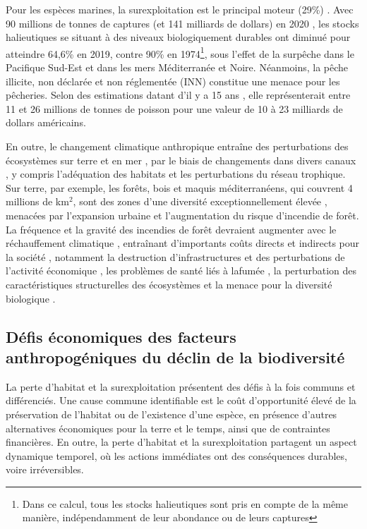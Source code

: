 Pour les espèces marines, la surexploitation est le principal moteur (29\%) \citep{ipbes_2022_6417333}. Avec 90 millions de tonnes de captures (et 141 milliards de dollars) en 2020 \citep{fao_2022_state}, les stocks halieutiques se situant à des niveaux biologiquement durables ont diminué pour atteindre 64,6\% en 2019, contre 90\% en 1974\footnote{Dans ce calcul, tous les stocks halieutiques sont pris en compte de la même manière, indépendamment de leur abondance ou de leurs captures}, sous l'effet de la surpêche dans le Pacifique Sud-Est et dans les mers Méditerranée et Noire. Néanmoins, la pêche illicite, non déclarée et non réglementée (INN) constitue une menace pour les pêcheries.  Selon des estimations datant d'il y a 15 ans \citep{agnew_estimating_2009} , elle représenterait entre 11 et 26 millions de tonnes de poisson pour une valeur de 10 à 23 milliards de dollars américains. 

En outre, le changement climatique anthropique entraîne des perturbations des écosystèmes sur terre \citep{burrell_anthropogenic_2020, conradi_reassessment_2024} et en mer \citep{gomes_marine_2024}, par le biais de changements dans divers canaux , y compris l'adéquation des habitats et les perturbations du réseau trophique. Sur terre, par exemple, les forêts, bois et maquis méditerranéens, qui couvrent 4 millions de km$^2$, sont des zones d'une diversité exceptionnellement élevée \citep{Mooney2001, blondel_2010}, menacées par l'expansion urbaine et l'augmentation du risque d'incendie de forêt.   La fréquence et la gravité des incendies de forêt devraient augmenter avec le réchauffement climatique \citep{Dupuy2019ClimateCI}, entraînant d'importants coûts directs et indirects pour la société , notamment la destruction d'infrastructures et des perturbations de l'activité économique \citep{wang_economic_2021}, les problèmes de santé liés à lafumée \citep{burke_wildfire_2023, heft-neal_behavior_2023}, la perturbation des caractéristiques structurelles des écosystèmes \citep{Ayars2023} et la menace pour la diversité biologique \citep{Wintle2020}.

{}
\subsection*{Défis économiques des facteurs anthropogéniques du déclin de la biodiversité}


La perte d'habitat et la surexploitation présentent des défis à la fois communs et différenciés.   Une cause commune identifiable est le coût d'opportunité élevé de la préservation de l'habitat ou de l'existence d'une espèce, en présence d'autres alternatives économiques pour la terre et le temps, ainsi que de contraintes financières. En outre, la perte d'habitat et la surexploitation partagent un aspect dynamique temporel, où les actions immédiates ont des conséquences durables, voire irréversibles.

